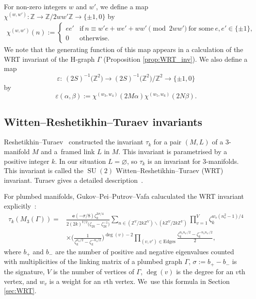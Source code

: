 \documentclass[11pt]{article}
\numberwithin{equation}{section}
\newcommand{\veps}{\varepsilon}
\newcommand{\Z}{\mathbb{Z}}
\DeclareMathOperator{\SU}{SU}
\numberwithin{equation}{section}
\begin{document}
For non-zero integers $ w $ and $ w' $, we define a map $ \chi^{(w, w')} \colon \Z \to \Z/2ww'\Z \to \{ \pm1, 0 \} $ by
\begin{gather*}
\chi^{(w, w')}(n) :=
\begin{cases}
	ee' & \text{if} \ n \equiv w'e + we' +ww' \pmod{2ww'} \ \text{for some}\ e, e' \in \{ \pm 1 \},
\\
	0 & \text{otherwise}.
\end{cases}
\end{gather*}
We note that the generating function of this map appears in a calculation of the WRT invariant of the H-graph $ \Gamma $ (Proposition \ref{prop:WRT_inv}).
We also define a map
\[
\veps \colon \ (2S)^{-1}\big(\Z^2\big) \to (2S)^{-1}\big(\Z^2\big)/\Z^2 \to \{ \pm1, 0 \}
\]
 by
\[
 \veps(\alpha, \beta) := \chi^{(w_3, w_4)}(2M\alpha) \chi^{(w_5, w_6)}(2N\beta) .
 \]

\setcounter{section}{2}\setcounter{subsection}{0}\setcounter{Theorem}{0}\setcounter{equation}{0}
\subsection{Witten--Reshetikhin--Turaev invariants} %

Reshetikhin--Turaev~\cite{RT} constructed the invariant $\tau_{k}$ for a pair $(M, L)$ of a 3-manifold $M$ and a~framed link $L$ in $M$.
This invariant is parametrised by a positive integer $k$.
In our situation \mbox{$L = \varnothing$}, so $\tau_{k}$ is an invariant for 3-manifolds.
This invariant is called the $\SU(2)$ Witten--Reshetikhin--Turaev (WRT) invariant.
Turaev gives a detailed description~\cite{R}.

For plumbed manifolds, Gukov--Pei--Putrov--Vafa caluculated the WRT invariant expli\-ci\-tly~\cite[formula~(A.10)]{GPPV}:
\begin{align*}
	\tau_{k}(M_{3}(\Gamma))
	={}
	&\frac{\bm{e}(-\sigma/8) \zeta_{k}^{3\sigma/4}}{2(2k)^{V/2} \big(\zeta_{2k}-\zeta_{2k}^{-1}\big)}
	\sum_{n \in (\Z^{V} / 2k\Z^{V}) \smallsetminus (k\Z^{V} / 2k\Z^{V})}
	\prod_{v=1}^{V}\zeta_{k}^{w_{v}(n_{v}^{2} - 1) / 4}
	\\
	&\times\bigg( \frac{1}{\zeta_{k}^{n_{v}/2} - \zeta_{k}^{-n_{v}/2}} \bigg)^{\deg(v)-2}
	\prod_{(v, v') \in \mathrm{Edges}} \frac{\zeta_{k}^{n_{v}n_{v'}/2} - \zeta_{k}^{-n_{v}n_{v'}/2}}{2},
\end{align*}
where $ b_+ $ and $ b_- $ are the number of positive and negative eigenvalues counted with multiplicities of the linking matrix of a plumbed graph $\Gamma$,
$\sigma := b_+ - b_- $ is the signature,
$V$ is the number of vertices of $\Gamma$,
$ \deg(v) $ is the degree for an $v$th vertex,
and $w_{v}$ is a weight for an $v$th vertex.
We~use this formula in Section \ref{sec:WRT}.
\end{document}
